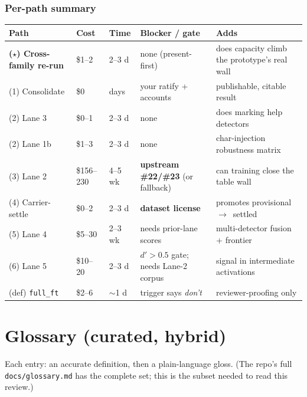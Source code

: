 \documentclass[11pt,parskip=half-]{scrartcl}
\newcommand{\arr}{\ensuremath{\rightarrow}}
\newcommand{\code}[1]{\texttt{\small #1}}
\begin{document}
\subsubsection{Per-path summary}
\begin{center}\small
\begin{tabularx}{\linewidth}{@{}l l l Y Y@{}}
\toprule
\textbf{Path} & \textbf{Cost} & \textbf{Time} & \textbf{Blocker / gate} & \textbf{Adds} \\
\midrule
\textbf{($\star$) Cross-family re-run} & \$1--2 & 2--3 d & none (present-first) & does capacity climb the prototype's real wall \\
(1) Consolidate & \$0 & days & your ratify + accounts & publishable, citable result \\
(2) Lane 3 & \$0--1 & 2--3 d & none & does marking help detectors \\
(2) Lane 1b & \$1--3 & 2--3 d & none & char-injection robustness matrix \\
(3) Lane 2 & \$156--230 & 4--5 wk & \textbf{upstream \#22/\#23} (or fallback) & can training close the table wall \\
(4) Carrier-settle & \$0--2 & 2--3 d & \textbf{dataset license} & promotes provisional \arr\ settled \\
(5) Lane 4 & \$5--30 & 2--3 wk & needs prior-lane scores & multi-detector fusion + frontier \\
(6) Lane 5 & \$10--20 & 2--3 d & $d' > 0.5$ gate; needs Lane-2 corpus & signal in intermediate activations \\
(def) \code{full\_ft} & \$2--6 & ${\sim}$1 d & trigger says \emph{don't} & reviewer-proofing only \\
\bottomrule
\end{tabularx}
\end{center}

\section{Glossary (curated, hybrid)}
Each entry: an accurate definition, then a plain-language gloss. (The repo's full \code{docs/glossary.md}
has the complete set; this is the subset needed to read this review.)
\end{document}
